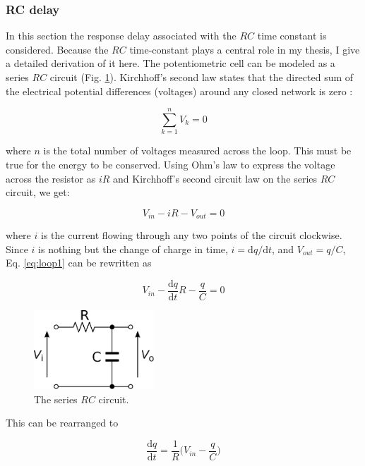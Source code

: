 \subsubsection{RC delay}
In this section the response delay associated with the $RC$ time constant is considered.
Because the $RC$ time-constant plays a central role in my thesis, I give a detailed derivation of it here.
The potentiometric cell can be modeled as a series $RC$ circuit (Fig. \ref{fig:rc}).
Kirchhoff's second law states that the directed sum of the electrical potential differences (voltages) around any closed network is zero \cite{hill2015art}:


\begin{equation}
\label{eq:kirchoff}
	\sum_{k=1}^{n} V_k = 0
\end{equation}

where $n$ is the total number of voltages measured across the loop.
This must be true for the energy to be conserved.
Using Ohm's law to express the voltage across the resistor as $iR$ and Kirchhoff's second circuit law on the series $RC$ circuit, we get:

\begin{equation}
\label{eq:loop1}
	V_{in} - iR - V_{out} = 0
\end{equation}

where $i$ is the current flowing through any two points of the circuit clockwise.
Since $i$ is nothing but the change of charge in time, $i = \mathrm{d}q / \mathrm{d}t$, and $V_{out} = q / C$, Eq. \ref{eq:loop1} can be rewritten as

\begin{equation}
\label{eq:loop2}
        V_{in} - \frac{\mathrm{d}q}{\mathrm{d}t}R - \frac{q}{C} = 0
\end{equation}

\begin{figure}
\centering
\includegraphics[width=0.4\textwidth]{img/theory/rc.eps}
\caption{The series $RC$ circuit.}
\label{fig:rc}
\end{figure}


This can be rearranged to

\begin{equation}
\label{eq:loop3}
        \frac{\mathrm{d}q}{\mathrm{d}t} = \frac{1}{R}\bigg(V_{in} - \frac{q}{C}\bigg)
\end{equation}

